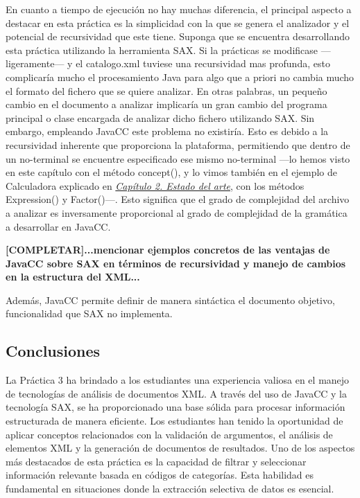 En cuanto a tiempo de ejecución no hay muchas diferencia, el principal aspecto a destacar en esta práctica es la simplicidad con la que se genera el analizador y el potencial de recursividad que este tiene. 
Suponga que se encuentra desarrollando esta práctica utilizando la herramienta SAX. Si la prácticas se modificase ---ligeramente--- y el catalogo.xml tuviese una recursividad mas profunda, esto complicaría mucho el procesamiento Java para algo que a priori no cambia mucho el formato del fichero que se quiere analizar. En otras palabras, un pequeño cambio en el documento a analizar implicaría un gran cambio del programa principal o clase encargada de analizar dicho fichero utilizando SAX.
Sin embargo, empleando JavaCC este problema no existiría. Esto es debido a la recursividad inherente que proporciona la plataforma, permitiendo que dentro de un no-terminal se encuentre especificado ese mismo no-terminal ---lo hemos visto en este capítulo con el método concept(), y lo vimos también en el ejemplo de Calculadora explicado en \hyperref[sec:cap2]{\textit{Capítulo 2. Estado del arte}}, con los métodos Expression() y Factor()---. Esto significa que el grado de complejidad del archivo a analizar es inversamente proporcional al grado de complejidad de la gramática a desarrollar en JavaCC.

\textbf{[COMPLETAR]...mencionar ejemplos concretos de las ventajas de JavaCC sobre SAX en términos de recursividad y manejo de cambios en la estructura del XML...}

Además, JavaCC permite definir de manera sintáctica el documento objetivo, funcionalidad que SAX no implementa.

\subsection{Conclusiones}

\noindent La Práctica 3 ha brindado a los estudiantes una experiencia valiosa en el manejo de tecnologías de análisis de documentos XML. A través del uso de JavaCC y la tecnología SAX, se ha proporcionado una base sólida para procesar información estructurada de manera eficiente. Los estudiantes han tenido la oportunidad de aplicar conceptos relacionados con la validación de argumentos, el análisis de elementos XML y la generación de documentos de resultados.
Uno de los aspectos más destacados de esta práctica es la capacidad de filtrar y seleccionar información relevante basada en códigos de categorías. Esta habilidad es fundamental en situaciones donde la extracción selectiva de datos es esencial.


